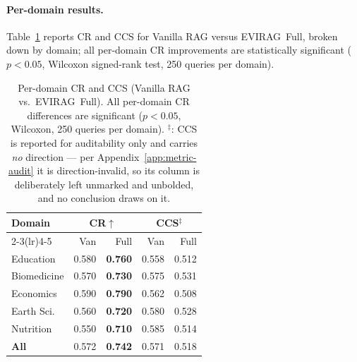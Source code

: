 \documentclass[11pt]{article}
\newcommand{\system}{\textsc{EVIRAG}\xspace}
\begin{document}
\paragraph{Per-domain results.}
Table~\ref{tab:perdomain} reports CR and CCS for Vanilla RAG versus
\system\ Full, broken down by domain; all per-domain CR improvements are
statistically significant ($p{<}0.05$, Wilcoxon signed-rank test,
250 queries per domain).
\begin{table}[h]
\centering\small
\setlength{\tabcolsep}{4pt}
\begin{tabular}{@{}lrrrr@{}}
\toprule
\textbf{Domain} & \multicolumn{2}{c}{\textbf{CR}$\uparrow$} & \multicolumn{2}{c}{\textbf{CCS}$^\ddagger$} \\
\cmidrule(lr){2-3}\cmidrule(lr){4-5}
 & Van & Full & Van & Full \\
\midrule
Education    & 0.580 & \textbf{0.760} & 0.558 & 0.512 \\
Biomedicine  & 0.570 & \textbf{0.730} & 0.575 & 0.531 \\
Economics    & 0.590 & \textbf{0.790} & 0.562 & 0.508 \\
Earth Sci.   & 0.560 & \textbf{0.720} & 0.580 & 0.528 \\
Nutrition    & 0.550 & \textbf{0.710} & 0.585 & 0.514 \\
\midrule
\textbf{All} & 0.572 & \textbf{0.742} & 0.571 & 0.518 \\
\bottomrule
\end{tabular}
\caption{Per-domain CR and CCS (Vanilla RAG vs.\ \system\ Full).
All per-domain CR differences are significant ($p{<}0.05$, Wilcoxon,
250 queries per domain).  $^\ddagger$: CCS is reported for auditability only
and carries \emph{no} direction --- per Appendix~\ref{app:metric-audit} it is
direction-invalid, so its column is deliberately left unmarked and unbolded,
and no conclusion draws on it.}
\label{tab:perdomain}
\end{table}
\end{document}
